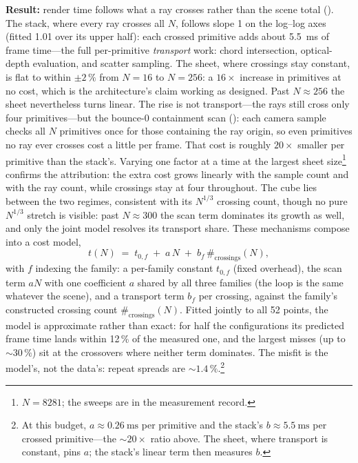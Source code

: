 \textbf{Result:} render time follows what a ray crosses rather than the scene total
(). The stack, where every ray crosses all $N$, follows slope \num{1} on the log--log axes
(fitted \num{1.01} over its upper half): each crossed primitive adds about \SI{5.5}{\milli\second} of frame time---the full
per-primitive \emph{transport} work: chord intersection, optical-depth evaluation, and
scatter sampling. The sheet, where crossings
stay constant, is flat to within $\pm2\,\%$ from $N{=}16$ to $N{=}256$: a $16\times$
increase in primitives at no cost, which is the architecture's claim working as designed.
Past $N\approx256$ the sheet nevertheless turns linear. The rise is not transport---the
rays still cross only four primitives---but the bounce-\num{0} containment scan
(): each camera sample checks all $N$ primitives once for those containing
the ray origin, so even primitives no ray ever crosses cost a little per frame. That cost is roughly $20\times$ smaller per primitive than the stack's. Varying one
factor at a time at the largest sheet size\footnote{$N{=}8281$; the sweeps are in the
measurement record.} confirms the attribution: the extra cost grows linearly with the
sample count and with the ray count, while crossings stay at four throughout.
The cube lies between the two regimes, consistent with its $N^{1/3}$ crossing count,
though no pure $N^{1/3}$ stretch is visible: past $N\approx300$ the scan term dominates
its growth as well, and only the joint model resolves its transport share. These mechanisms compose into a cost model,
\[
  t(N) \;=\; t_{0,f} \;+\; a\,N \;+\; b_f\,\#_{\text{crossings}}(N),
\]
with $f$ indexing the family: a per-family constant $t_{0,f}$ (fixed overhead), the scan
term $a N$ with one coefficient $a$ shared by all three families (the loop is the same
whatever the scene), and a transport term $b_f$ per crossing, against the family's
constructed crossing count $\#_{\text{crossings}}(N)$. Fitted jointly to all \num{52} points, the model is approximate rather than exact: for
half the configurations its predicted frame time lands within \num{12}\,\% of the
measured one, and the largest misses (up to ${\sim}30\,\%$) sit at the crossovers where
neither term dominates. The misfit is the model's, not the data's: repeat spreads are
${\sim}\num{1.4}\,\%$.\footnote{At this budget, $a\approx\SI{0.26}{\milli\second}$ per
primitive and the stack's $b\approx\SI{5.5}{\milli\second}$ per crossed primitive---the
${\sim}20\times$ ratio above. The sheet, where transport is constant, pins $a$; the
stack's linear term then measures $b$.}

